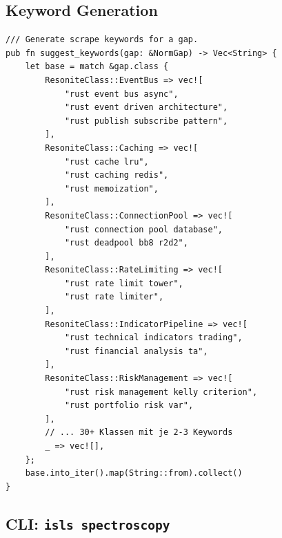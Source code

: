 \documentclass[11pt,a4paper]{article}
\begin{document}
\subsection{Keyword Generation}

\begin{lstlisting}[style=rust]
/// Generate scrape keywords for a gap.
pub fn suggest_keywords(gap: &NormGap) -> Vec<String> {
    let base = match &gap.class {
        ResoniteClass::EventBus => vec![
            "rust event bus async",
            "rust event driven architecture",
            "rust publish subscribe pattern",
        ],
        ResoniteClass::Caching => vec![
            "rust cache lru",
            "rust caching redis",
            "rust memoization",
        ],
        ResoniteClass::ConnectionPool => vec![
            "rust connection pool database",
            "rust deadpool bb8 r2d2",
        ],
        ResoniteClass::RateLimiting => vec![
            "rust rate limit tower",
            "rust rate limiter",
        ],
        ResoniteClass::IndicatorPipeline => vec![
            "rust technical indicators trading",
            "rust financial analysis ta",
        ],
        ResoniteClass::RiskManagement => vec![
            "rust risk management kelly criterion",
            "rust portfolio risk var",
        ],
        // ... 30+ Klassen mit je 2-3 Keywords
        _ => vec![],
    };
    base.into_iter().map(String::from).collect()
}
\end{lstlisting}

\subsection{CLI: \texttt{isls spectroscopy}}
\end{document}
